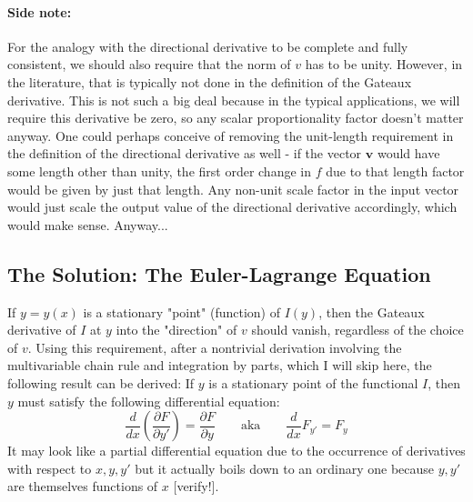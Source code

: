 \paragraph{Side note:} For the analogy with the directional derivative to be complete and fully consistent, we should also require that the norm of $v$ has to be unity. However, in the literature, that is typically not done in the definition of the Gateaux derivative. This is not such a big deal because in the typical applications, we will require this derivative be zero, so any scalar proportionality factor doesn't matter anyway. One could perhaps conceive of removing the unit-length requirement in the definition of the directional derivative as well - if the vector $\mathbf{v}$ would have some length other than unity, the first order change in $f$ due to that length factor would be given by just that length. Any non-unit scale factor in the input vector would just scale the output value of the directional derivative accordingly, which would make sense. Anyway...




\subsection{The Solution: The Euler-Lagrange Equation}
If $y = y(x)$ is a stationary "point" (function) of $I(y)$, then the Gateaux derivative of $I$ at $y$ into the "direction" of $v$ should vanish, regardless of the choice of $v$. Using this requirement, after a nontrivial derivation involving the multivariable chain rule and integration by parts, which I will skip here, the following result can be derived: If $y$ is a stationary point of the functional $I$, then $y$ must satisfy the following differential equation:
\begin{equation}
 \frac{d}{d x} \left(  \frac{\partial F}{\partial y'}  \right) = \frac{\partial F}{\partial y}
 \qquad \text{aka} \qquad
 \frac{d}{d x} F_{y'} = F_{y}
\end{equation}
It may look like a partial differential equation due to the occurrence of derivatives with respect to $x,y,y'$ but it actually boils down to an ordinary one because $y,y'$ are themselves functions of $x$ [verify!].

